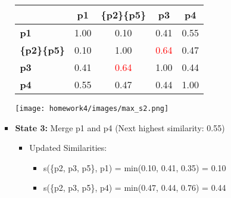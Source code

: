 \documentclass[11pt]{article}
\begin{document}
\begin{enumerate}
\begin{enumerate}
\begin{itemize}
\begin{table}[H]
        \centering
        \begin{minipage}{0.7\textwidth}  %
            \centering
            \begin{minipage}{0.4\textwidth}
                \centering
                \label{tb:exp1}
                \begin{tabular}{ l| c | c | c | c}\hline
                           & \textbf{p1} & \textbf{\{p2\}}\textbf{\{p5\}}  & \textbf{p3} & \textbf{p4} \\ \hline
                    \bf p1 & 1.00        & 0.10         & 0.41        & 0.55               \\
                    \bf \{p2\}\{p5\} & 0.10        & 1.00         & \textcolor{red}{0.64}        & 0.47               \\
                    \bf p3 & 0.41        & \textcolor{red}{0.64}         & 1.00        & 0.44               \\
                    \bf p4 & 0.55        & 0.47         & 0.44        & 1.00               \\
                    \hline
                \end{tabular}
            \end{minipage}%
            \hfill
            \begin{minipage}{0.3\textwidth}
                \centering
                \texttt{[image: homework4/images/max\_s2.png]}
                \label{fig:your-image}
            \end{minipage}
        \end{minipage}
    \end{table}

        \item \textbf{State 3:} Merge p1 and p4 (Next highest similarity: 0.55)

        \begin{itemize}
        \item Updated Similarities:
        \begin{itemize}
            \item s(\{p2, p3, p5\}, p1) = min(0.10, 0.41, 0.35) = 0.10
            \item s(\{p2, p3, p5\}, p4) = min(0.47, 0.44, 0.76) = 0.44
        \end{itemize}
    \end{itemize}
    

\end{itemize}
\end{enumerate}
\end{enumerate}
\end{document}
